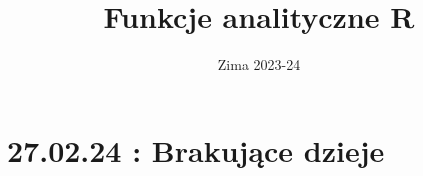 \documentclass[a5paper, twoside]{article}
\title{Funkcje analityczne R}
\author{}
\date{Zima 2023-24}
\begin{document}

\maketitle
\thispagestyle{empty} 
\newpage

\tableofcontents
\thispagestyle{empty}
\newpage

\pagestyle{fancy}



\section{27.02.24 : Brakujące dzieje}


\end{document}
